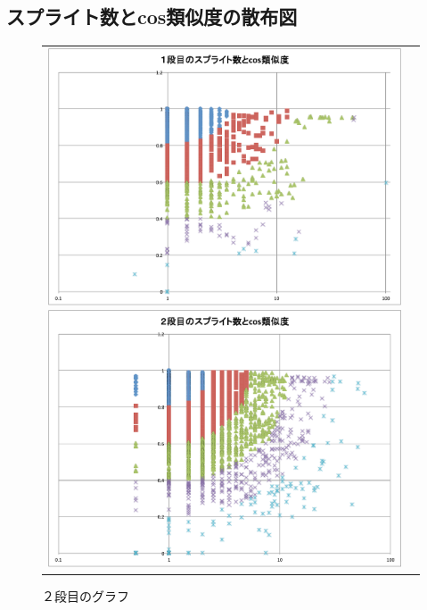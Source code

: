 \documentclass[twocolumn,9pt,a4paper]{jsarticle}
\begin{document}
\subsection{スプライト数とcos類似度の散布図}
\begin{figure}[ht]
 \begin{tabular}{cc}
 	\begin{minipage}[t]{0.45\hsize}
	 \centering
	 \includegraphics[keepaspectratio, scale = 0.15]{graph_1_splite.pdf}
	 \caption{１段目のグラフ}
	 \label{first_splite}
	\end{minipage}
        \begin{minipage}[t]{0.45\hsize}
	 \centering
	 \includegraphics[keepaspectratio, scale = 0.15]{graph_2_splite.pdf}
	 \caption{２段目のグラフ}
	 \label{second_splite}

\end{minipage}
\end{tabular}
\end{figure}
\end{document}
